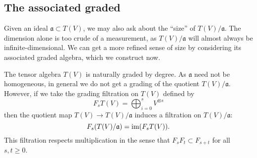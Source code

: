 \subsection{The associated graded}\label{sec:assoc-graded}
Given an ideal $\mathfrak{a} \subset T(V)$, we may also ask about the ``size'' of $T(V)/\mathfrak{a}$. The dimension alone is too crude of a measurement, as $T(V)/\mathfrak{a}$ will almost always be infinite-dimensional. We can get a more refined sense of size by considering its associated graded algebra, which we construct now.

The tensor algebra $T(V)$ is naturally graded by degree. As $\mathfrak{a}$ need not be homogeneous, in general we do not get a grading of the quotient $T(V)/\mathfrak{a}$. However, if we take the grading filtration on $T(V)$ defined by
\[
	F_s T(V) = \bigoplus_{i=0}^s V^{\otimes s}
\]
then the quotient map $T(V) \to T(V)/\mathfrak{a}$ induces a filtration on $T(V)/\mathfrak{a}$:
\[
	F_s(T(V)/\mathfrak{a}) = \operatorname{im} (F_s T(V)).
\]
This filtration respects multiplication in the sense that $F_s F_t \subset F_{s+t}$ for all $s,t \geq 0$.

